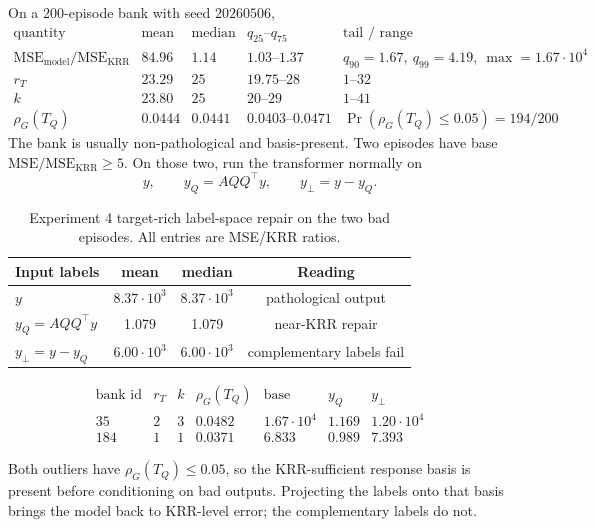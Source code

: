 \documentclass[11pt]{article}
\begin{document}
On a 200-episode bank with seed \(20260506\),
\[
\begin{array}{c|cccc}
\text{quantity} & \text{mean} & \text{median} & q_{25}\text{--}q_{75} & \text{tail / range}\\
\hline
\mathrm{MSE}_{\mathrm{model}}/\mathrm{MSE}_{\mathrm{KRR}}
& 84.96 & 1.14 & 1.03\text{--}1.37 & q_{90}=1.67,\ q_{99}=4.19,\ \max=1.67\cdot10^4\\
r_T & 23.29 & 25 & 19.75\text{--}28 & 1\text{--}32\\
k & 23.80 & 25 & 20\text{--}29 & 1\text{--}41\\
\rho_G(T_Q) & 0.0444 & 0.0441 & 0.0403\text{--}0.0471 & \Pr(\rho_G(T_Q)\le0.05)=194/200
\end{array}
\]
The bank is usually non-pathological and basis-present. Two episodes have base
\(\mathrm{MSE}/\mathrm{MSE}_{\mathrm{KRR}}\ge5\). On those two, run the transformer normally on
\[
y,\qquad y_Q=AQQ^\top y,\qquad y_\perp=y-y_Q.
\]

\begin{table}[htbp]
\centering
\caption{Experiment 4 target-rich label-space repair on the two bad episodes. All entries are
MSE/KRR ratios.}
\small
\setlength{\tabcolsep}{4pt}
\begin{tabular}{@{}lccc@{}}
\toprule
Input labels & mean & median & Reading\\
\midrule
\(y\) & \(8.37\cdot10^3\) & \(8.37\cdot10^3\) & pathological output\\
\(y_Q=AQQ^\top y\) & 1.079 & 1.079 & near-KRR repair\\
\(y_\perp=y-y_Q\) & \(6.00\cdot10^3\) & \(6.00\cdot10^3\) & complementary labels fail\\
\bottomrule
\end{tabular}
\end{table}

\[
\begin{array}{c|cccccc}
\text{bank id} & r_T & k & \rho_G(T_Q) &
\text{base} & y_Q & y_\perp\\
\hline
35 & 2 & 3 & 0.0482 & 1.67\cdot10^4 & 1.169 & 1.20\cdot10^4\\
184 & 1 & 1 & 0.0371 & 6.833 & 0.989 & 7.393
\end{array}
\]

Both outliers have \(\rho_G(T_Q)\le0.05\), so the KRR-sufficient response basis is present before
conditioning on bad outputs. Projecting the labels onto that basis brings the model back to
KRR-level error; the complementary labels do not.
\end{document}
